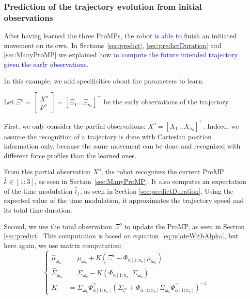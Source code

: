 \documentclass[utf8]{frontiersSCNS} %
\newcommand{\rev}[1]{\textcolor{blue}{#1}}
\begin{document}
\subsubsection{Prediction of the trajectory evolution from initial observations}
\label{prediction}

After having learned the three ProMPs, the robot \rev{is able to} finish an initiated movement on its own. In Sections~\ref{sec:predict}, \ref{sec:predictDuration} and \ref{sec:ManyProMP} we explained how \rev{to compute the future intended trajectory given the early observations}. %

In this example, we add specificities about the parameters to learn.

Let $\Xi^{o} = \begin{bmatrix} X^o \\ F^o \end{bmatrix} = [\Xi_1 \ldots \Xi_{n_o}]^\top$ be the early observations of the trajectory.

First, we only consider the partial observations: $X^{o} = [X_1 \ldots X_{n_o}]^\top$.
Indeed, we assume the recognition of a trajectory is done with Cartesian position information only, because the same movement can be done and recognized with different force profiles than the learned ones.

From this partial observation $X^o$, the robot recognizes the current ProMP $\hat{k} \in [1:3]$, as seen in Section~\ref{sec:ManyProMP}. It also computes an expectation of the time modulation $\hat{t}_f$, as seen in Section \ref{sec:predictDuration}. Using the expected value of the time modulation, it approximates the trajectory speed and its total time duration.

Second, we use the total observation $\Xi^o$ to update the ProMP, as seen in Section \ref{sec:predict}. This computation is based on equation~\ref{eq:udateWithAlpha}, but here again, we use matrix computation:
$$\left\{
\begin{array}{rl}
\hat{\mu}_{\boldsymbol{\omega}_k} &= \mu_{\boldsymbol{\omega}_k}  + K(\Xi^o - \Phi_{\alpha[1:n_o]} \mu_{\boldsymbol{\omega}_k} ) \\ 
\hat{\Sigma}_{\boldsymbol{\omega}_k}  &= \Sigma_{\boldsymbol{\omega}_k}  - K(\Phi_{\alpha[1:n_o]}\Sigma_{\boldsymbol{\omega}_k} ) \\
K&= \Sigma_{\boldsymbol{\omega}_k} \Phi_{\alpha[1:n_o]}^\top(\Sigma_{\xi^o} + \Phi_{\alpha[1:n_o]}\Sigma_{\boldsymbol{\omega}_k}  \Phi_{\alpha[1:n_o]}^\top)^{-1}
\end{array}
\right.$$
\end{document}
